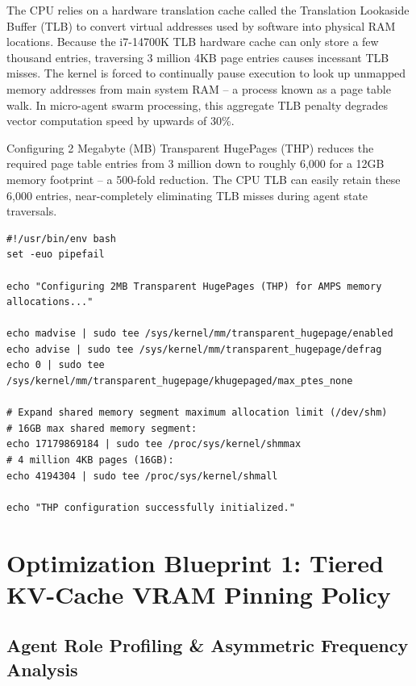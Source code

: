 The CPU relies on a hardware translation cache called the Translation Lookaside Buffer (TLB) to convert virtual addresses used by software into physical RAM locations. Because the i7-14700K TLB hardware cache can only store a few thousand entries, traversing 3 million 4KB page entries causes incessant TLB misses. The kernel is forced to continually pause execution to look up unmapped memory addresses from main system RAM -- a process known as a page table walk. In micro-agent swarm processing, this aggregate TLB penalty degrades vector computation speed by upwards of 30\%.

Configuring 2 Megabyte (MB) Transparent HugePages (THP) reduces the required page table entries from 3 million down to roughly 6,000 for a 12GB memory footprint -- a 500-fold reduction. The CPU TLB can easily retain these 6,000 entries, near-completely eliminating TLB misses during agent state traversals.

\vspace{\baselineskip}

\label{listing:thp_config}
\begin{verbatim}
#!/usr/bin/env bash
set -euo pipefail

echo "Configuring 2MB Transparent HugePages (THP) for AMPS memory allocations..."

echo madvise | sudo tee /sys/kernel/mm/transparent_hugepage/enabled
echo advise | sudo tee /sys/kernel/mm/transparent_hugepage/defrag
echo 0 | sudo tee /sys/kernel/mm/transparent_hugepage/khugepaged/max_ptes_none

# Expand shared memory segment maximum allocation limit (/dev/shm)
# 16GB max shared memory segment:
echo 17179869184 | sudo tee /proc/sys/kernel/shmmax
# 4 million 4KB pages (16GB):
echo 4194304 | sudo tee /proc/sys/kernel/shmall

echo "THP configuration successfully initialized."
\end{verbatim}
\par\vspace*{\baselineskip}

\section{Optimization Blueprint 1: Tiered KV-Cache VRAM Pinning Policy}

\subsection{Agent Role Profiling \& Asymmetric Frequency Analysis}

